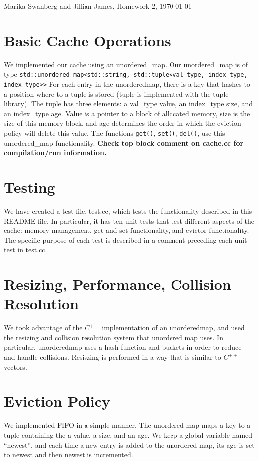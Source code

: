 \documentclass[12pt]{article}
\author{Marika Swanberg}
\begin{document}
Marika Swanberg and Jillian James, Homework 2, \today
\bigskip 

\section{Basic Cache Operations}
We implemented our cache using an unordered\_map. Our unordered\_map is of type \texttt{std::unordered\_map<std::string, std::tuple<val\_type, index\_type, index\_type>>} For each entry in the unorderedmap, there is a key that hashes to a position where to a tuple is stored (tuple is implemented with the tuple library). The tuple has three elements: a val\_type value, an index\_type size, and an index\_type age. Value is a pointer to a block of allocated memory, size is the size of this memory block, and age determines the order in which the eviction policy will delete this value. The functions \texttt{get()}, \texttt{set()}, \texttt{del()}, use this unordered\_map functionality. \textbf{Check top block comment on cache.cc for compilation/run information.}

\section{Testing}
We have created a test file, test.cc, which tests the functionality described in this README file. In particular, it has ten unit tests that test different aspects of the cache: memory management, get and set functionality, and evictor functionality. The specific purpose of each test is described in a comment preceding each unit test in test.cc.

\section{Resizing, Performance, Collision Resolution}
We took advantage of the $C^{++}$ implementation of an unorderedmap, and used the resizing and collision resolution system that unordered map uses. In particular, unorderedmap uses a hash function and buckets in order to reduce and handle collisions. Resiszing is performed in a way that is similar to $C^{++}$ vectors.


\section{Eviction Policy}
We implemented FIFO in a simple manner. The unordered map maps a key to a tuple containing the a value, a size, and an age. We keep a global
variable named ``newest'', and each time a new entry is added to the unordered map, its age is set to newest and then newest is incremented.
\end{document}
